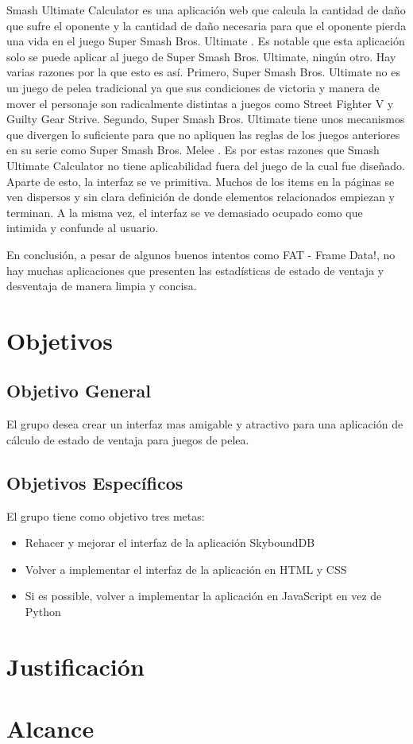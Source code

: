 Smash Ultimate Calculator es una aplicación web que calcula la cantidad de daño que sufre el oponente y la cantidad de daño necesaria para que el oponente pierda una vida en el juego Super Smash Bros. Ultimate \cite{noauthor_super_2022}. Es notable que esta aplicación solo se puede aplicar al juego de Super Smash Bros. Ultimate, ningún otro. Hay varias razones por la que esto es así. Primero, Super Smash Bros. Ultimate no es un juego de pelea tradicional ya que sus condiciones de victoria y manera de mover el personaje son radicalmente distintas a juegos como Street Fighter V y Guilty Gear Strive. Segundo, Super Smash Bros. Ultimate tiene unos mecanismos que divergen lo suficiente para que no apliquen las reglas de los juegos anteriores en su serie como Super Smash Bros. Melee \cite{noauthor_super_nodate}. Es por estas razones que Smash Ultimate Calculator no tiene aplicabilidad fuera del juego de la cual fue diseñado. Aparte de esto, la interfaz se ve primitiva. Muchos de los items en la páginas se ven dispersos y sin clara definición de donde elementos relacionados empiezan y terminan. A la misma vez, el interfaz se ve demasiado ocupado como que intimida y confunde al usuario.

En conclusión, a pesar de algunos buenos intentos como FAT - Frame Data!, no hay muchas aplicaciones que presenten las estadísticas de estado de ventaja y desventaja de manera limpia y concisa.

\section{Objetivos}

\subsection{Objetivo General} 

El grupo desea crear un interfaz mas amigable y atractivo para una aplicación de cálculo de estado de ventaja para juegos de pelea.

\subsection{Objetivos Específicos}

El grupo tiene como objetivo tres metas:
\begin{itemize}
    \item Rehacer y mejorar el interfaz de la aplicación SkyboundDB \cite{aramis_matos_aramis-matosskybounddb_2021}
    \item Volver a implementar el interfaz de la aplicación en HTML y CSS
    \item Si es possible, volver a implementar la aplicación en JavaScript en vez de Python
\end{itemize}

\section{Justificación}

\section{Alcance}


